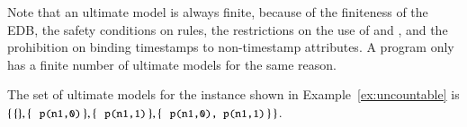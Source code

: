 Note that an ultimate model is always finite, because of the finiteness of the EDB, the safety conditions on rules, the restrictions on the use of  and , and the prohibition on binding timestamps to non-timestamp attributes.  A \lang program only has a finite number of ultimate models for the same reason.

\begin{example}
The set of ultimate models for the \lang instance shown in Example~\ref{ex:uncountable} is $\{ \, \{\}, \{ \, \dedalus{p(n1,0)} \, \}, \{ \, \dedalus{p(n1,1)} \, \}, \{ \, \dedalus{p(n1,0), p(n1,1)} \, \} \, \}$.
\end{example}




